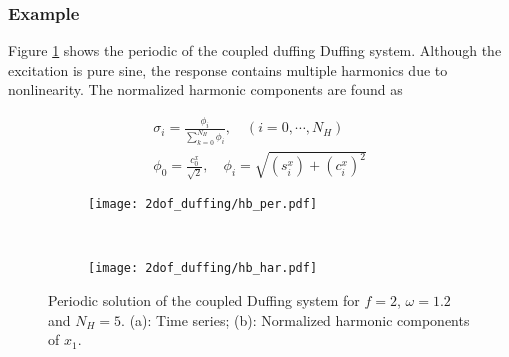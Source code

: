 \subsubsection{Example}
\label{sec:hb_example}

Figure \ref{fig:hb_duffing_periodic} shows the periodic of the coupled duffing
Duffing system. Although the excitation is pure sine, the response contains
multiple harmonics due to nonlinearity. The normalized harmonic components are
found as

\begin{equation}
  \label{eq:hb_normal_coeff}
  \begin{aligned}
    \sigma_i = \frac{\phi_i}{\sum_{k=0}^{N_H} \phi_i}, \quad (i=0,\cdots, N_H) \\
    \phi_0 = \frac{c_0^x}{\sqrt{2}}, \quad \phi_i = \sqrt{(s^x_i) + (c^x_i)^2}
  \end{aligned}
\end{equation}


\begin{figure}[!ht]
  \centering
  \begin{subfigure}[b]{0.6\textwidth}
    \texttt{[image: 2dof\_duffing/hb\_per.pdf]}
    \caption{}
  \end{subfigure}
  ~
  \begin{subfigure}[b]{0.36\textwidth}
    \texttt{[image: 2dof\_duffing/hb\_har.pdf]}
    \caption{}
  \end{subfigure}
    \caption{Periodic solution of the coupled Duffing system for $f=2$,
    $\omega=1.2$ and $N_H=5$.
    (a): Time series; (b): Normalized harmonic components of $x_1$.}
  \label{fig:hb_duffing_periodic}
\end{figure}
\FloatBarrier


